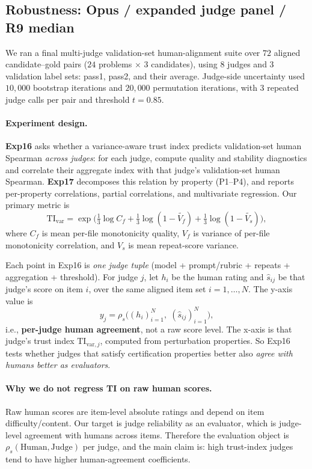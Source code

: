 \documentclass{article}
\begin{document}
\subsection{Robustness: Opus / expanded judge panel / R9 median}\label{sec:validation-human-alignment}
We ran a final multi-judge validation-set human-alignment suite over \(72\) aligned candidate--gold pairs (\(24\) problems \(\times\) \(3\) candidates), using \(8\) judges and \(3\) validation label sets: pass1, pass2, and their average.
Judge-side uncertainty used \(10{,}000\) bootstrap iterations and \(20{,}000\) permutation iterations, with \(3\) repeated judge calls per pair and threshold \(t=0.85\).

\paragraph{Experiment design.}
\textbf{Exp16} asks whether a variance-aware trust index predicts validation-set human Spearman \emph{across judges}: for each judge, compute quality and stability diagnostics and correlate their aggregate index with that judge's validation-set human Spearman.
\textbf{Exp17} decomposes this relation by property (P1--P4), and reports per-property correlations, partial correlations, and multivariate regression.
Our primary metric is
\[
  \mathrm{TI}_{\mathrm{var}}
  =\exp\!\Big(\tfrac{1}{3}\log C_f+\tfrac{1}{3}\log(1-\widetilde{V_f})+\tfrac{1}{3}\log(1-\widetilde{V_s})\Big),
\]
where \(C_f\) is mean per-file monotonicity quality, \(V_f\) is variance of per-file monotonicity correlation, and \(V_s\) is mean repeat-score variance.

Each point in Exp16 is \emph{one judge tuple} (model + prompt/rubric + repeats + aggregation + threshold).
For judge \(j\), let \(h_i\) be the human rating and \(\hat{s}_{ij}\) be that judge's score on item \(i\), over the same aligned item set \(i=1,\dots,N\).
The y-axis value is
\[
  y_j = \rho_s\!\big((h_i)_{i=1}^N,\;(\hat{s}_{ij})_{i=1}^N\big),
\]
i.e., \textbf{per-judge human agreement}, not a raw score level.
The x-axis is that judge's trust index \(\mathrm{TI}_{\mathrm{var},j}\), computed from perturbation properties.
So Exp16 tests whether judges that satisfy certification properties better also \emph{agree with humans better as evaluators}.

\paragraph{Why we do not regress TI on raw human scores.}
Raw human scores are item-level absolute ratings and depend on item difficulty/content.
Our target is judge reliability as an evaluator, which is judge-level agreement with humans across items.
Therefore the evaluation object is \(\rho_s(\text{Human},\text{Judge})\) per judge, and the main claim is:
high trust-index judges tend to have higher human-agreement coefficients.
\end{document}
